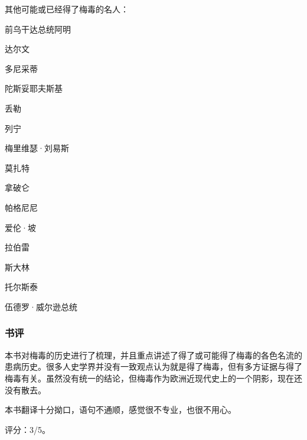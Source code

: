 其他可能或已经得了梅毒的名人：
\begin{itemize*}
	\item 前乌干达总统阿明
	\item 达尔文
	\item 多尼采蒂
	\item 陀斯妥耶夫斯基
	\item 丢勒
	\item 列宁
	\item 梅里维瑟·刘易斯
	\item 莫扎特
	\item 拿破仑
	\item 帕格尼尼
	\item 爱伦·坡
	\item 拉伯雷
	\item 斯大林
	\item 托尔斯泰
	\item 伍德罗·威尔逊总统
\end{itemize*}

\subsubsection{书评}
本书对梅毒的历史进行了梳理，并且重点讲述了得了或可能得了梅毒的各色名流的患病历史。很多人史学界并没有一致观点认为就是得了梅毒，但有多方证据与得了梅毒有关。虽然没有统一的结论，但梅毒作为欧洲近现代史上的一个阴影，现在还没有散去。

本书翻译十分拗口，语句不通顺，感觉很不专业，也很不用心。

评分：3/5。